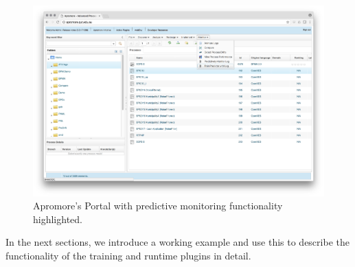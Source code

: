 \begin{figure}[t!]%
	\centering
	\includegraphics[width=\textwidth]{img/apromore-menus}
	\vspace{-2\baselineskip}
	\caption{Apromore's Portal with predictive monitoring functionality highlighted.}
	\label{fig:apromore-menus}
	\vspace{-0.5\baselineskip}
\end{figure}

In the next sections, we introduce a working example and use this to describe the functionality of the training and runtime plugins in detail.

